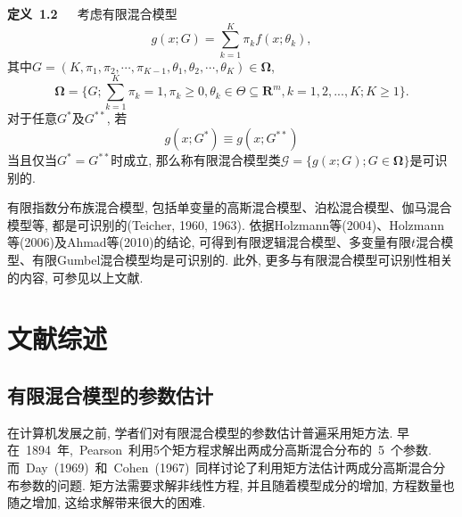 \documentclass[a4paper,12pt,openany,oneside,utf-8]{ctexbook}
\newcommand{\xiaosihao}{\fontsize{12pt}{\baselineskip}\selectfont}
\begin{document}
\textbf{\xiaosihao 定义~1.2~}~~考虑有限混合模型
\begin{equation*}
  g(x; G)=\sum_{k=1}^{K}\pi_{k}f(x; \theta_{k}),
\end{equation*}
其中$G=(K, \pi_{1}, \pi_{2}, \cdots, \pi_{K-1}, \theta_{1}, \theta_{2}, \cdots, \theta_{K}) \in \bm{\Omega}$,
\begin{equation*}
  \bm{\Omega}=\{G; \sum_{k=1}^{K}\pi_{k}=1, \pi_{k}\geq0, \theta_{k}\in\Theta\subseteq\bm{R}^{m}, k=1, 2, ..., K; K\geq1\}.
\end{equation*}
对于任意$G^{*}$及$G^{**}$, 若
\begin{equation*}
  g(x; G^{*})  \equiv g(x; G^{**})
\end{equation*}
当且仅当$G^{*}=G^{**}$时成立, 那么称有限混合模型类$\mathcal{G} = \{ g(x; G); G \in \bm{\Omega} \}$是可识别的.

有限指数分布族混合模型, 包括单变量的高斯混合模型、泊松混合模型、伽马混合模型等, 都是可识别的(Teicher, 1960, 1963). 依据Holzmann等(2004)、Holzmann等(2006)及Ahmad等(2010)的结论, 可得到有限逻辑混合模型、多变量有限$t$混合模型、有限Gumbel混合模型均是可识别的. 此外, 更多与有限混合模型可识别性相关的内容, 可参见以上文献.

\section{文献综述}

\subsection{有限混合模型的参数估计}
在计算机发展之前, 学者们对有限混合模型的参数估计普遍采用矩方法. 早在~1894~年,~Pearson~利用5个矩方程求解出两成分高斯混合分布的~5~个参数. 而~Day~(1969)~和~Cohen~(1967)~同样讨论了利用矩方法估计两成分高斯混合分布参数的问题. 矩方法需要求解非线性方程, 并且随着模型成分的增加, 方程数量也随之增加, 这给求解带来很大的困难. 
\end{document}
